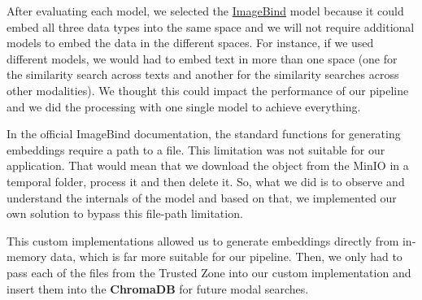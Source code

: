 \documentclass[12pt]{article}
\begin{document}
After evaluating each model, we selected the \href{https://github.com/facebookresearch/ImageBind}{ImageBind} model because it could embed all three data types into the same space and we will not require additional models to embed the data in the different spaces. For instance, if we used different models, we would had to embed text in more than one space (one for the similarity search across texts and another for the similarity searches across other modalities). We thought this could impact the performance of our pipeline and we did the processing with one single model to achieve everything.

In the official ImageBind documentation, the standard functions for generating embeddings require a path to a file. This limitation was not suitable for our application. That would mean that we download the object from the MinIO in a temporal folder, process it and then delete it. So, what we did is to observe and understand the internals of the model and based on that, we implemented our own solution to bypass this file-path limitation.

This custom implementations allowed us to generate embeddings directly from in-memory data, which is far more suitable for our pipeline. Then, we only had to pass each of the files from the Trusted Zone into our custom implementation and insert them into the \textbf{ChromaDB} for future modal searches.
\end{document}
